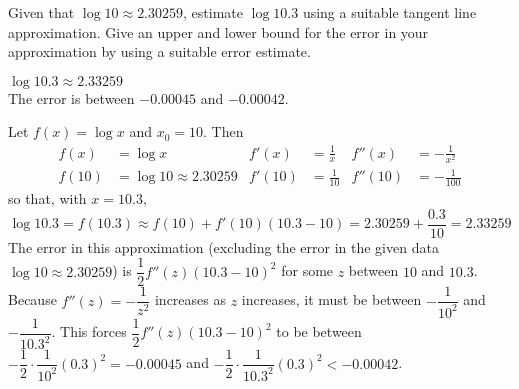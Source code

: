 \begin{question}[1999H]
Given that $\log 10\approx 2.30259$, estimate $\log 10.3$ using
a suitable tangent line approximation. Give an upper and lower bound
for the error in your approximation by using a suitable error estimate.
\end{question}
\begin{answer}
$\log 10.3 \approx 2.33259$\\
The error is between
$-0.00045$ and $-0.00042$.
\end{answer}
\begin{solution}
 Let $f(x)=\log x$ and $x_0=10$. Then
\begin{align*}
f(x)&=\log x &
f'(x)&=\frac{1}{x} & f''(x)&=-\frac{1}{x^2} \\
f(10)&=\log 10\approx 2.30259 &
f'(10)&=\frac{1}{10} & f''(10)&=-\frac{1}{100}
\end{align*}
so that, with $x=10.3$,
$$
\log 10.3=f(10.3)\approx f(10)+f'(10)(10.3-10)
=2.30259+\frac{0.3}{10}
=2.33259
$$
The error in this approximation (excluding the error in the given data
$\log 10\approx 2.30259$) is $\dfrac{1}{2} f''(z)(10.3-10)^2$ for some $z$ between
$10$ and $10.3$. Because $f''(z)=-\dfrac{1}{z^2}$ increases as $z$ increases,
it must be between $-\dfrac{1}{10^2}$ and $-\dfrac{1}{10.3^2}$. This forces
$\dfrac{1}{2} f''(z)(10.3-10)^2$ to be between
$-\dfrac{1}{2}\cdot \dfrac{1}{10^2}(0.3)^2=-0.00045$ and
$-\dfrac{1}{2}\cdot \dfrac{1}{10.3^2}(0.3)^2<-0.00042$.
\end{solution}


